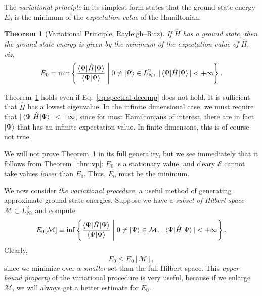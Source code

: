 \documentclass{report}
\theoremstyle{plain}
\newtheorem{theorem}{Theorem}[chapter]
\theoremstyle{definition}
\begin{document}
The \emph{variational principle} in its simplest form states that the
ground-state energy $E_0$ is the minimum of the \emph{expectation
  value} of the Hamiltonian:
\begin{theorem}[Variational Principle, Rayleigh--Ritz]\label{thm:rr}
If $\hat{H}$ has a ground state, then the ground-state energy is given
by the minimum of the expectation value of $\hat{H}$, viz,
\begin{equation}
  E_0 = \min \left\{
    \frac{\braket{\Psi|\hat{H}|\Psi}}{\braket{\Psi|\Psi}} \; \Bigg| \;
    0 \neq \ket{\Psi} \in L^2_N, \; |\braket{\Psi|\hat{H}|\Psi}| < +\infty \right\}.
\end{equation}
\end{theorem}
Theorem~\ref{thm:rr} holds even if Eq.~\eqref{eq:spectral-decomp} does
not hold. It is sufficient that $\hat{H}$ has a lowest eigenvalue. In
the infinite dimensional case, we
must require that $|\braket{\Psi|\hat{H}|\Psi}|<+\infty$, since for
most Hamiltonians of interest, there are in fact $\ket{\Psi}$ that has
an infinite expectation value. In finite dimensons, this is of course
not true.

We will not prove Theorem~\ref{thm:rr} in its full generality, but we
see immediately that it follows from Theorem~\ref{thm:vp}: $E_0$ is a
stationary value, and cleary $\mathcal{E}$ cannot take values
\emph{lower} than $E_0$. Thus, $E_0$ must be the minimum.

We now consider \emph{the variational procedure}, a useful method of
generating approximate ground-state energies.
Suppose we have a \emph{subset of Hilbert space} $\mathcal{M} \subset L^2_N$, and
compute
\begin{equation}
  E_0[\mathcal{M}] \equiv \inf \left\{
    \frac{\braket{\Psi|\hat{H}|\Psi}}{\braket{\Psi|\Psi}} \; \Bigg| \;
    0 \neq \ket{\Psi} \in \mathcal{M}, \; |\braket{\Psi|\hat{H}|\Psi}|
    < +\infty \right\}.
  \label{eq:vp}
\end{equation}
Clearly,
\begin{equation}
  E_0 \leq E_0[\mathcal{M}] ,
\end{equation}
since we minimize over a \emph{smaller} set than the full Hilbert space.
This \emph{upper bound property} of the variational procedure is very
useful, because if we enlarge $\mathcal{M}$, we will always get a
better estimate for $E_0$.
\end{document}
